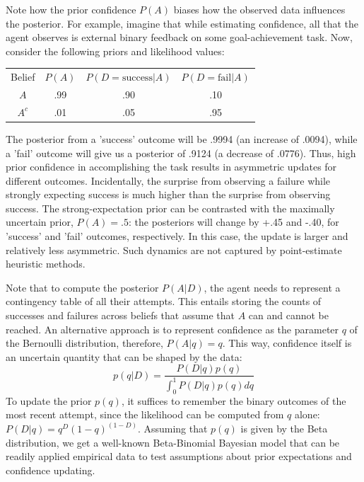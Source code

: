 Note how the prior confidence $P(A)$ biases how the observed data influences the posterior. For example, imagine that while estimating confidence, all that the agent observes is external binary feedback on some goal-achievement task. Now, consider the following priors and likelihood values:
\begin{center}
\begin{tabular}{c c c c}
Belief & $P(A)$ & $P(D=\mathrm{success}|A)$ & $P(D=\mathrm{fail}|A)$ \\ 
$A$    & .99    & .90                       & .10        \\  
$A^c$  & .01    & .05                       & .95         
\end{tabular}
\end{center}
The posterior from a 'success' outcome will be .9994 (an increase of .0094), while a 'fail' outcome will give us a posterior of .9124 (a decrease of .0776). Thus, high prior confidence in accomplishing the task results in asymmetric updates for different outcomes. Incidentally, the surprise from observing a failure while strongly expecting success is much higher than the surprise from observing success. The strong-expectation prior can be contrasted with the maximally uncertain prior, $P(A) = .5$: the posteriors will change by +.45 and -.40, for 'success' and 'fail' outcomes, respectively. In this case, the update is larger and relatively less asymmetric. Such dynamics are not captured by point-estimate heuristic methods.

Note that to compute the posterior $P(A|D)$, the agent needs to represent a contingency table of all their attempts. This entails storing the counts of successes and failures across beliefs that assume that $A$ can and cannot be reached. An alternative approach is to represent confidence as the parameter $q$ of the Bernoulli distribution, therefore, $P(A|q) = q$. This way, confidence itself is an uncertain quantity that can be shaped by the data:
\begin{equation}
    p(q|D) = \frac{P(D|q) p(q)}{\int_{0}^{1}P(D|q)p(q)dq}
\end{equation}
To update the prior $p(q)$, it suffices to remember the binary outcomes of the most recent attempt, since the likelihood can be computed from $q$ alone: $P(D|q) = q^D(1-q)^{(1-D)}$. Assuming that $p(q)$ is given by the Beta distribution, we get a well-known Beta-Binomial Bayesian model that can be readily applied empirical data to test assumptions about prior expectations and confidence updating.

